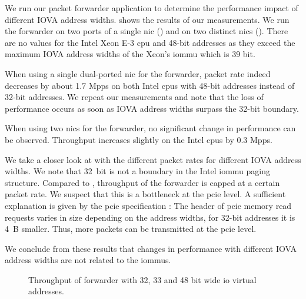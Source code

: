 We run our packet forwarder application to determine the performance impact of
different IOVA address widths.  shows
the results of our measurements. We run the forwarder on two ports of a single
\ac{nic} () and on two
distinct \acp{nic} ().
There are no values for the Intel Xeon E-3 \ac{cpu} and 48-bit addresses as they
exceed the maximum IOVA address widths of the Xeon's \ac{iommu} which is 39 bit.

When using a single dual-ported \ac{nic} for the forwarder, packet rate indeed
decreases by about 1.7 Mpps on both Intel \acp{cpu} with 48-bit addresses
instead of 32-bit addresses. We repeat our measurements and note that the loss
of performance occurs as soon as IOVA address widths surpass the 32-bit
boundary.

When using two \acp{nic} for the forwarder, no significant change in performance
can be observed. Throughput increases slightly on the Intel \acp{cpu} by 0.3
Mpps.

We take a closer look at 
with the different packet rates for different IOVA address widths. We note that
32~bit is not a boundary in the Intel \ac{iommu} paging structure. Compared to
, throughput of the
forwarder is capped at a certain packet rate. We suspect that this is a
bottleneck at the \ac{pcie} level. A sufficient explanation is given by the
\ac{pcie} specification \cite{pcie2017specification}: The header of \ac{pcie}
memory read requests varies in size depending on the address widths, for 32-bit
addresses it is 4~B smaller. Thus, more packets can be transmitted at the
\ac{pcie} level.

We conclude from these results that changes in performance with different IOVA
address widths are not related to the \acp{iommu}.

\begin{figure}%
	\centering

    \caption{Throughput of forwarder with 32, 33 and 48 bit wide \acs{io} virtual
        addresses.}
	\label{fig:iova-address-widths-throughput}
\end{figure}


